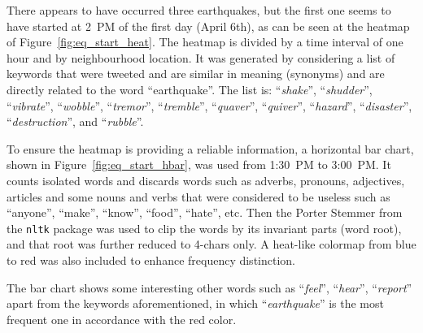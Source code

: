 There appears to have occurred three earthquakes, but the first one seems to
have started at 2~PM of the first day (April 6th), as
can be seen at the heatmap of Figure~\ref{fig:eq_start_heat}. The heatmap is
divided by a time interval of one hour and by neighbourhood location. It was
generated by considering a list of keywords that were tweeted and are similar in 
meaning (synonyms) and are directly related to the word ``earthquake''. The list 
is: ``\emph{shake}'', ``\emph{shudder}'', ``\emph{vibrate}'', ``\emph{wobble}'',
``\emph{tremor}'', ``\emph{tremble}'', ``\emph{quaver}'', ``\emph{quiver}'',
``\emph{hazard}'', ``\emph{disaster}'', ``\emph{destruction}'', and
``\emph{rubble}''.

To ensure the heatmap is providing a reliable information, a horizontal bar
chart, shown in Figure~\ref{fig:eq_start_hbar}, was used from 1:30~PM to 
3:00~PM. It counts isolated 
words and discards words such as adverbs, pronouns, adjectives, articles and 
some nouns and verbs that were considered to be useless such as ``anyone'',
``make'', ``know'', ``food'', ``hate'', etc. Then the Porter Stemmer from the
\texttt{nltk} package was used to clip the words by its invariant parts (word 
root), and that root was further reduced to 4-chars only. A heat-like colormap
from blue to red was also included to enhance frequency distinction. 

The bar chart shows some interesting other words such as ``\emph{feel}'',
``\emph{hear}'', ``\emph{report}'' apart from the keywords aforementioned, in
which ``\emph{earthquake}'' is the most frequent one in accordance with the red
color.

